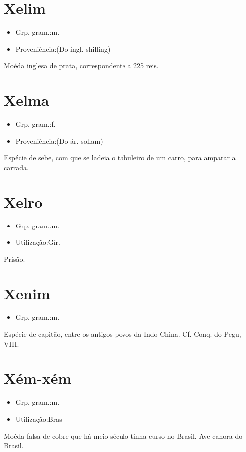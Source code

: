 \section{Xelim}
\begin{itemize}
\item {Grp. gram.:m.}
\end{itemize}
\begin{itemize}
\item {Proveniência:(Do ingl. \textunderscore shilling\textunderscore )}
\end{itemize}
Moéda inglesa de prata, correspondente a 225 reis.
\section{Xelma}
\begin{itemize}
\item {Grp. gram.:f.}
\end{itemize}
\begin{itemize}
\item {Proveniência:(Do ár. \textunderscore sollam\textunderscore )}
\end{itemize}
Espécie de sebe, com que se ladeia o tabuleiro de um carro, para amparar a carrada.
\section{Xelro}
\begin{itemize}
\item {Grp. gram.:m.}
\end{itemize}
\begin{itemize}
\item {Utilização:Gír.}
\end{itemize}
Prisão.
\section{Xenim}
\begin{itemize}
\item {Grp. gram.:m.}
\end{itemize}
Espécie de capitão, entre os antigos povos da Indo-China. Cf. \textunderscore Conq. do Pegu\textunderscore , VIII.
\section{Xém-xém}
\begin{itemize}
\item {Grp. gram.:m.}
\end{itemize}
\begin{itemize}
\item {Utilização:Bras}
\end{itemize}
Moéda falsa de cobre que há meio século tinha curso no Brasil.
Ave canora do Brasil.
